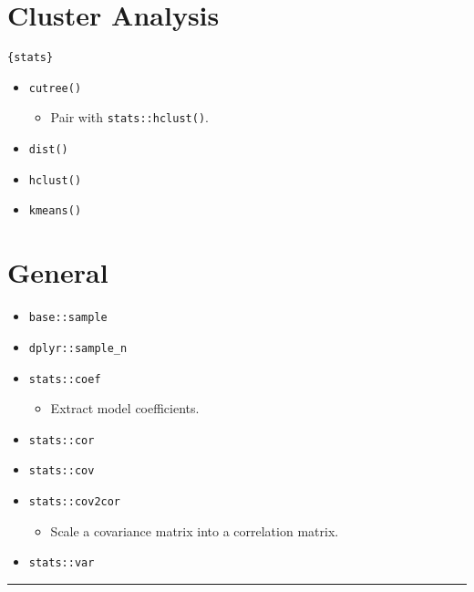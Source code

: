 \documentclass[
]{book}
\providecommand{\tightlist}{%
  \setlength{\itemsep}{0pt}\setlength{\parskip}{0pt}}
\begin{document}
\hypertarget{cluster-analysis}{%
\section{Cluster Analysis}\label{cluster-analysis}}

\texttt{\{stats\}}

\begin{itemize}
\tightlist
\item
  \texttt{cutree()}

  \begin{itemize}
  \tightlist
  \item
    Pair with \texttt{stats::hclust()}.
  \end{itemize}
\item
  \texttt{dist()}
\item
  \texttt{hclust()}
\item
  \texttt{kmeans()}
\end{itemize}

\hypertarget{general}{%
\section{General}\label{general}}

\begin{itemize}
\tightlist
\item
  \texttt{base::sample}
\item
  \texttt{dplyr::sample\_n}
\item
  \texttt{stats::coef}

  \begin{itemize}
  \tightlist
  \item
    Extract model coefficients.
  \end{itemize}
\item
  \texttt{stats::cor}
\item
  \texttt{stats::cov}
\item
  \texttt{stats::cov2cor}

  \begin{itemize}
  \tightlist
  \item
    Scale a covariance matrix into a correlation matrix.
  \end{itemize}
\item
  \texttt{stats::var}
\end{itemize}

\begin{center}\rule{0.5\linewidth}{0.5pt}\end{center}
\end{document}
